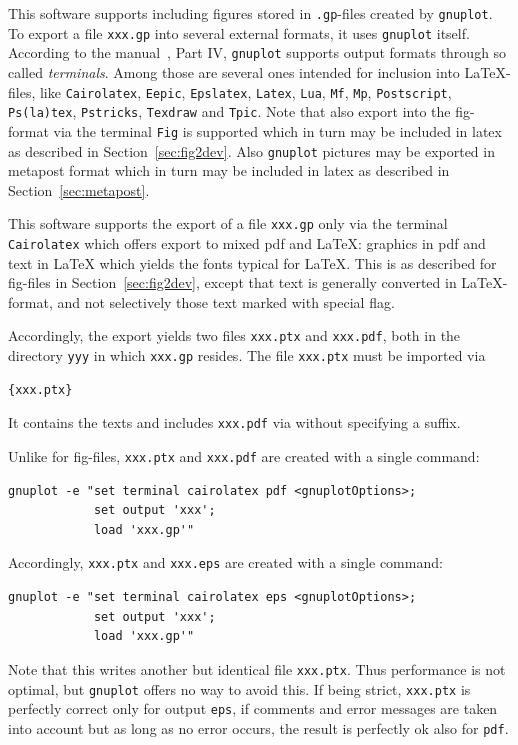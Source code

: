 \documentclass[12pt]{book}
\begin{document}
This software supports including 
figures stored in \texttt{.gp}-files created by \texttt{gnuplot}.
To export a file \texttt{xxx.gp} into several external formats, 
it uses \texttt{gnuplot} itself. 
According to the manual~\cite{GnuPlot}, Part IV, 
\texttt{gnuplot} supports output formats through so called {\em terminals}. 
Among those are several ones intended for inclusion into \LaTeX-files, 
like \texttt{Cairolatex}, \texttt{Eepic}, \texttt{Epslatex}, 
\texttt{Latex}, \texttt{Lua}, 
\texttt{Mf}, \texttt{Mp}, \texttt{Postscript}, \texttt{Ps(la)tex}, %
\texttt{Pstricks}, \texttt{Texdraw} and \texttt{Tpic}. 
Note that also export into the fig-format via the terminal \texttt{Fig} 
is supported which in turn may be included in latex 
as described in Section~\ref{sec:fig2dev}. 
Also \texttt{gnuplot} pictures may be exported in metapost format 
which in turn may be included in latex 
as described in Section~\ref{sec:metapost}. 

This software supports the export of a file \texttt{xxx.gp} 
only via the terminal \texttt{Cairolatex} 
which offers export to mixed pdf and \LaTeX\@: 
graphics in pdf and text in \LaTeX{}
which yields the fonts typical for \LaTeX. 
This is as described for fig-files in Section~\ref{sec:fig2dev}, 
except that text is generally converted in \LaTeX{}-format, 
and not selectively those text marked with special flag. 

Accordingly, the export yields two files \texttt{xxx.ptx} and
\texttt{xxx.pdf}, both in the directory \texttt{yyy} 
in which \texttt{xxx.gp} resides. 
The file \texttt{xxx.ptx} must be imported via 
%
\begin{lstlisting}[language=TeX]
{xxx.ptx}
\end{lstlisting}
%
It contains the texts and includes \texttt{xxx.pdf} 
via  without specifying a suffix. 

Unlike for fig-files, 
\texttt{xxx.ptx} and \texttt{xxx.pdf} are created with a single command: 
%
\begin{verbatim}
gnuplot -e "set terminal cairolatex pdf <gnuplotOptions>;
            set output 'xxx';
            load 'xxx.gp'"
\end{verbatim}

Accordingly, 
\texttt{xxx.ptx} and \texttt{xxx.eps} are created with a single command: 
%
\begin{verbatim}
gnuplot -e "set terminal cairolatex eps <gnuplotOptions>;
            set output 'xxx';
            load 'xxx.gp'"
\end{verbatim}
%
Note that this writes another but identical file \texttt{xxx.ptx}. 
Thus performance is not optimal, 
but \texttt{gnuplot} offers no way to avoid this. 
If being strict, 
\texttt{xxx.ptx} is perfectly correct only for output \texttt{eps},
if comments and error messages are taken into account 
but as long as no error occurs, 
the result is perfectly ok also for \texttt{pdf}. 
\end{document}
